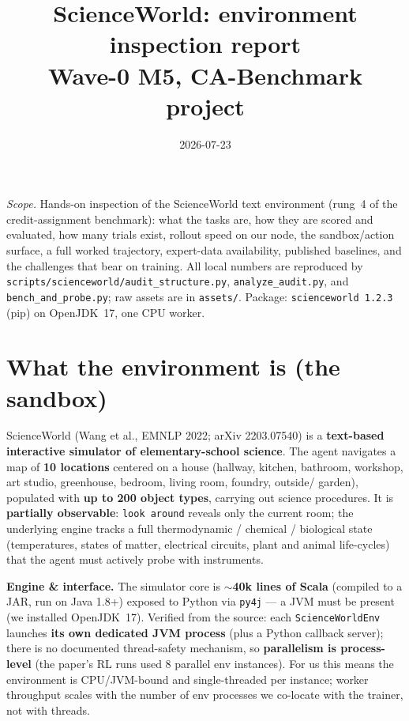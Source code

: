 \documentclass[10pt]{article}
\title{\vspace{-1.5cm}\textbf{ScienceWorld: environment inspection report}\\[2pt]
\large Wave-0 M5, CA-Benchmark project}
\author{}
\date{2026-07-23}
\newcommand{\cmd}[1]{\texttt{\small #1}}
\begin{document}
\maketitle
\vspace{-0.6cm}

\noindent\small\textit{Scope.} Hands-on inspection of the ScienceWorld text environment (rung~4 of
the credit-assignment benchmark): what the tasks are, how they are scored and evaluated, how many
trials exist, rollout speed on our node, the sandbox/action surface, a full worked trajectory, expert-data
availability, published baselines, and the challenges that bear on training. All local numbers are
reproduced by \cmd{scripts/scienceworld/audit\_structure.py}, \cmd{analyze\_audit.py}, and
\cmd{bench\_and\_probe.py}; raw assets are in \cmd{assets/}. Package: \cmd{scienceworld 1.2.3} (pip) on
OpenJDK~17, one CPU worker.\normalsize

\section{What the environment is (the sandbox)}
ScienceWorld (Wang et al., EMNLP 2022; arXiv 2203.07540) is a \textbf{text-based interactive simulator of
elementary-school science}. The agent navigates a map of \textbf{10 locations} centered on a house
(hallway, kitchen, bathroom, workshop, art studio, greenhouse, bedroom, living room, foundry, outside/
garden), populated with \textbf{up to 200 object types}, carrying out science procedures. It is
\textbf{partially observable}: \cmd{look around} reveals only the current room; the underlying engine
tracks a full thermodynamic / chemical / biological state (temperatures, states of matter, electrical
circuits, plant and animal life-cycles) that the agent must actively probe with instruments.

\smallskip
\noindent\textbf{Engine \& interface.} The simulator core is \textbf{$\sim$40k lines of Scala}
(compiled to a JAR, run on Java 1.8+) exposed to Python via \texttt{py4j} --- a JVM must be present (we
installed OpenJDK~17). Verified from the source: each \cmd{ScienceWorldEnv} launches \textbf{its own
dedicated JVM process} (plus a Python callback server); there is no documented thread-safety mechanism, so
\textbf{parallelism is process-level} (the paper's RL runs used 8 parallel env instances). For us this
means the environment is CPU/JVM-bound and single-threaded per instance; worker throughput scales with the
number of env processes we co-locate with the trainer, not with threads.
\end{document}
